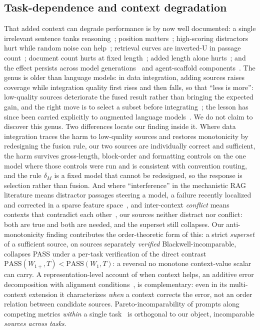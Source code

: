 \documentclass[11pt]{article}
\theoremstyle{plain}
\theoremstyle{definition}
\theoremstyle{remark}
\newcommand{\PASS}{\mathrm{PASS}}
\begin{document}
\subsection{Task-dependence and context degradation}
\label{sec:related-taskdep}

That added context can degrade performance is by now well documented: a single irrelevant
sentence tanks reasoning~\citep{shi2023distracted}; position matters~\citep{liu2024lost};
high-scoring distractors hurt while random noise can help~\citep{cuconasu2024noise}; retrieval
curves are inverted-U in passage count~\citep{jin2024longrag}; document count hurts at fixed
length~\citep{levy2025moredocs}; added length alone hurts~\citep{contexthurts2025}; and the effect
persists across model generations~\citep{hong2025contextrot} and agent-scaffold
components~\citep{longcontextdegrade2026}. The genus is older than language models: in data
integration, adding sources raises coverage while integration quality first rises and then
falls, so that ``less is more'': low-quality sources deteriorate the fused result rather than
bringing the expected gain, and the right move is to select a subset before
integrating~\citep{dong2013lessismore}; the lesson has since been carried explicitly to augmented language
models~\citep{halevy2023learnings}. We do not claim to discover this genus. Two differences locate
our finding inside it. Where data integration traces the harm to low-quality sources and restores
monotonicity by redesigning the fusion rule, our two sources are individually correct and
sufficient, the harm survives gross-length, block-order and formatting controls on the one model
where those controls were run and is consistent with convention routing, and the rule $\delta_M$
is a fixed model that cannot be redesigned, so the response is
selection rather than fusion. And where ``interference'' in the mechanistic RAG literature means
distractor passages steering a model, a failure recently localized and corrected in a sparse
feature space~\citep{giannetti2026interference}, and inter-context \emph{conflict} means contexts
that contradict each other~\citep{xu2024knowledgeconflicts}, our sources neither distract nor
conflict: both are true and both are needed, and the superset still collapses. Our
anti-monotonicity finding contributes the order-theoretic form of this: a strict \emph{superset} of
a sufficient source, on sources separately \emph{verified} Blackwell-incomparable, collapses PASS
under a per-task verification of the direct contrast $\PASS(W_{1+},T)<\PASS(W_1,T)$: a reversal no
monotone context-value scalar can carry. A representation-level account of when context
helps, an additive error decomposition with alignment conditions~\citep{wang2026whencontext}, is
complementary: even in its multi-context extension it characterizes \emph{when} a context
corrects the error, not an order relation between candidate sources. Pareto-incomparability of prompts along competing metrics \emph{within} a single
task~\citep{paretoprompts2025} is orthogonal to our object, incomparable \emph{sources across
tasks}.
\end{document}
